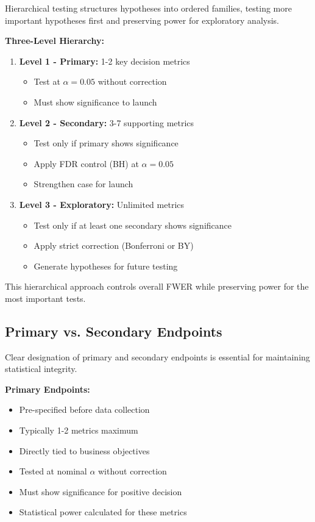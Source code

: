 Hierarchical testing structures hypotheses into ordered families, testing more important hypotheses first and preserving power for exploratory analysis.

\textbf{Three-Level Hierarchy:}

\begin{enumerate}
    \item \textbf{Level 1 - Primary:} 1-2 key decision metrics
    \begin{itemize}
        \item Test at $\alpha = 0.05$ without correction
        \item Must show significance to launch
    \end{itemize}

    \item \textbf{Level 2 - Secondary:} 3-7 supporting metrics
    \begin{itemize}
        \item Test only if primary shows significance
        \item Apply FDR control (BH) at $\alpha = 0.05$
        \item Strengthen case for launch
    \end{itemize}

    \item \textbf{Level 3 - Exploratory:} Unlimited metrics
    \begin{itemize}
        \item Test only if at least one secondary shows significance
        \item Apply strict correction (Bonferroni or BY)
        \item Generate hypotheses for future testing
    \end{itemize}
\end{enumerate}

This hierarchical approach controls overall FWER while preserving power for the most important tests.

\subsection{Primary vs. Secondary Endpoints}

Clear designation of primary and secondary endpoints is essential for maintaining statistical integrity.

\textbf{Primary Endpoints:}

\begin{itemize}
    \item Pre-specified before data collection
    \item Typically 1-2 metrics maximum
    \item Directly tied to business objectives
    \item Tested at nominal $\alpha$ without correction
    \item Must show significance for positive decision
    \item Statistical power calculated for these metrics
\end{itemize}

